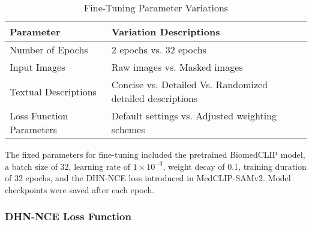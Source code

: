 \documentclass[./dissertation.tex]{subfiles}
\begin{document}
\begin{table}[htbp]
    \centering
    \caption{Fine-Tuning Parameter Variations}
    \label{tab:fine-tune-params}
    \begin{tabular}{ll}
        \toprule
        \textbf{Parameter}       & \textbf{Variation Descriptions}                           \\ \midrule
        Number of Epochs         & 2 epochs vs. 32 epochs                                    \\
        Input Images             & Raw images vs. Masked images                              \\
        Textual Descriptions     & Concise vs. Detailed Vs. Randomized detailed descriptions \\
        Loss Function Parameters & Default settings vs. Adjusted weighting schemes           \\
        \bottomrule
    \end{tabular}
\end{table}
The fixed parameters for fine-tuning included the pretrained BiomedCLIP model, a batch size of 32, learning rate of \(1\times10^{-3}\), weight decay of 0.1, training duration of 32 epochs, and the DHN-NCE loss introduced in MedCLIP-SAMv2. Model checkpoints were saved after each epoch.



\subsubsection{DHN-NCE Loss Function}


\end{document}
